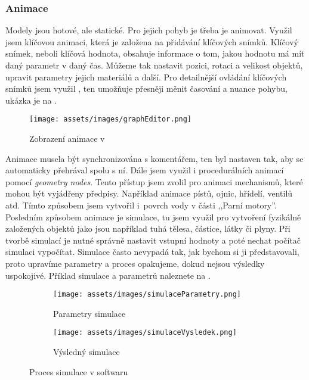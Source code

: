 \subsubsection{Animace}
{Modely jsou hotové, ale statické. Pro jejich pohyb je třeba je animovat. Využil jsem klíčovou animaci, která je založena na přidávání klíčových snímků. Klíčový snímek, neboli klíčová hodnota, obsahuje informace o tom, jakou hodnotu má mít daný parametr v daný čas. Můžeme tak nastavit pozici, rotaci a velikost objektů, upravit parametry jejich materiálů a další.}\odst
{Pro detailnější ovládání klíčových snímků jsem využil , ten umožňuje přesněji měnit časování a nuance pohybu, ukázka  je na .}
\begin{figure}[H]
    \centering
    \texttt{[image: assets/images/graphEditor.png]}
    \caption{Zobrazení animace v  \jaObr}
    \label{obr:grafEditor}
\end{figure}
{Animace musela být synchronizována s komentářem, ten byl nastaven tak, aby se automaticky přehrával spolu s ní. Dále jsem využil i procedurálních animací pomocí \textit{geometry nodes}. Tento přístup jsem zvolil pro animaci mechanismů, které mohou být vyjádřeny předpisy. Například animace pístů, ojnic, hřídelí, ventilů atd. Tímto způsobem jsem vytvořil i~povrch vody v části ,,Parní motory''.}\odst
{Posledním způsobem animace je simulace, tu jsem využil pro vytvoření fyzikálně založených objektů jako jsou například tuhá tělesa, částice, látky či plyny. Při tvorbě simulací je nutné správně nastavit vstupní hodnoty a poté nechat počítač simulaci vypočítat. Simulace často nevypadá tak, jak bychom si ji představovali, proto upravíme parametry a proces opakujeme, dokud nejsou výsledky uspokojivé. Příklad simulace a parametrů naleznete na .}
\begin{figure}[H]
    \centering
    \begingroup
    \makeatletter
    \renewcommand\thesubfigure{\thefigure~--~\@nameuse{subfiglabel@\alph{subfigure}}}
    \newcommand{\subfiglabel@a}{vlevo}
    \newcommand{\subfiglabel@b}{vpravo}
    \captionsetup[subfigure]{labelformat=simple, labelsep=colon}
    \renewcommand\p@subfigure{}
    \makeatother
    \begin{subfigure}{0.35\textwidth}
        \centering
        \texttt{[image: assets/images/simulaceParametry.png]}
        \caption{Parametry simulace\\\jaObr}
    \end{subfigure}%
    \begin{subfigure}{0.6\textwidth}
        \centering
        \texttt{[image: assets/images/simulaceVysledek.png]}
        \caption{Výsledný simulace \jaObr}
    \end{subfigure}
    \endgroup
    \caption{Proces simulace v softwaru }
    \label{obr:simulace}
\end{figure}
\newpage
